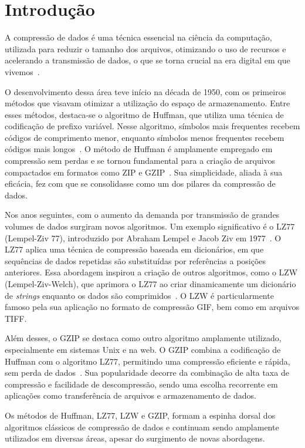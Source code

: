 \chapter{Introdução}
\label{c.introducao}

A compressão de dados é uma técnica essencial na ciência da computação, utilizada para reduzir o tamanho dos arquivos, otimizando o uso de recursos e acelerando a transmissão de dados, o que se torna crucial na era digital em que vivemos~\cite{salomon2007data}.  

O desenvolvimento dessa área teve início na década de 1950, com os primeiros métodos que visavam otimizar a utilização do espaço de armazenamento. Entre esses métodos, destaca-se o algoritmo de Huffman, que utiliza uma técnica de codificação de prefixo variável. Nesse algoritmo, símbolos mais frequentes recebem códigos de comprimento menor, enquanto símbolos menos frequentes recebem códigos mais longos~\cite{salomon2007data}. O método de Huffman é amplamente empregado em compressão sem perdas e se tornou fundamental para a criação de arquivos compactados em formatos como ZIP e GZIP~\cite{deutsch1996gzip}. Sua simplicidade, aliada à sua eficácia, fez com que se consolidasse como um dos pilares da compressão de dados.  

Nos anos seguintes, com o aumento da demanda por transmissão de grandes volumes de dados surgiram novos algoritmos. Um exemplo significativo é o LZ77 (Lempel-Ziv 77), introduzido por Abraham Lempel e Jacob Ziv em 1977~\cite{ziv1977universal}. O LZ77 aplica uma técnica de compressão baseada em dicionários, em que sequências de dados repetidas são substituídas por referências a posições anteriores. Essa abordagem inspirou a criação de outros algoritmos, como o LZW (Lempel-Ziv-Welch), que aprimora o LZ77 ao criar dinamicamente um dicionário de \textit{strings} enquanto os dados são comprimidos~\cite{welch1984technique}. O LZW é particularmente famoso pela sua aplicação no formato de compressão GIF, bem como em arquivos TIFF.  

Além desses, o GZIP se destaca como outro algoritmo amplamente utilizado, especialmente em sistemas Unix e na web. O GZIP combina a codificação de Huffman com o algoritmo LZ77, permitindo uma compressão eficiente e rápida, sem perda de dados~\cite{deutsch1996gzip}. Sua popularidade decorre da combinação de alta taxa de compressão e facilidade de descompressão, sendo uma escolha recorrente em aplicações como transferência de arquivos e armazenamento de dados.  

Os métodos de Huffman, LZ77, LZW e GZIP, formam a espinha dorsal dos algoritmos clássicos de compressão de dados e continuam sendo amplamente utilizados em diversas áreas, apesar do surgimento de novas abordagens.  

